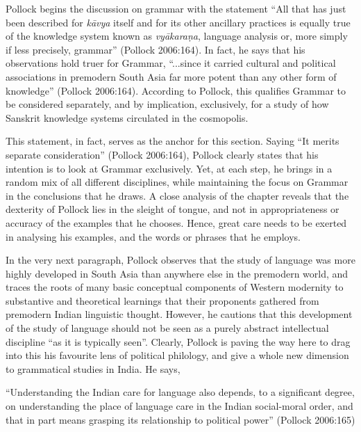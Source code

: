 Pollock begins the discussion on grammar with the statement ``All that has just been described for {\sl kāvya} itself and for its other ancillary practices is equally true of the knowledge system known as {\sl vyākaraṇa}, language analysis or, more simply if less precisely, grammar'' (Pollock 2006:164). In fact, he says that his observations hold truer for Grammar, ``...since it carried cultural and political associations in premodern South Asia far more potent than any other form of knowledge'' (Pollock 2006:164). According to Pollock, this qualifies Grammar to be considered separately, and by implication, exclusively, for a study of how Sanskrit knowledge systems circulated in the cosmopolis. 

This statement, in fact, serves as the anchor for this section. Saying ``It merits separate consideration'' (Pollock 2006:164), Pollock clearly states that his intention is to look at Grammar exclusively. Yet, at each step, he brings in a random mix of all different disciplines, while maintaining the focus on Grammar in the conclusions that he draws. A close analysis of the chapter reveals that the dexterity of Pollock lies in the sleight of tongue, and not in appropriateness or accuracy of the examples that he chooses. Hence, great care needs to be exerted in analysing his examples, and the words or phrases that he employs.

In the very next paragraph, Pollock observes that the study of language was more highly developed in South Asia than anywhere else in the premodern world, and traces the roots of many basic conceptual components of Western modernity to substantive and theoretical learnings that their proponents gathered from premodern Indian linguistic thought. However, he cautions that this development of the study of language should not be seen as a purely abstract intellectual discipline ``as it is typically seen''. Clearly, Pollock is paving the way here to drag into this his favourite lens of political philology, and give a whole new dimension to grammatical studies in India. He says, 
\begin{myquote}
``Understanding the Indian care for language also depends, to a significant degree, on understanding the place of language care in the Indian social-moral order, and that in part means grasping its relationship to political power'' 
\hfill (Pollock 2006:165)
\end{myquote}

